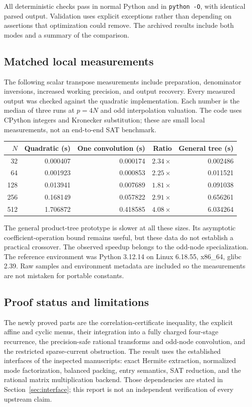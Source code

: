 All deterministic checks pass in normal Python and in \texttt{python -O},
with identical parsed output. Validation uses explicit exceptions rather
than depending on assertions that optimization could remove. The archived
results include both modes and a summary of the comparison.

\subsection{Matched local measurements}
The following scalar transpose measurements include preparation,
denominator inversions, increased working precision, and output recovery.
Every measured output was checked against the quadratic implementation.
Each number is the median of three runs at $p=4N$ and odd interpolation
valuation. The code uses CPython integers and Kronecker substitution;
these are small local measurements, not an end-to-end SAT benchmark.
\begin{center}\small
\begin{tabular}{r r r r r}
\toprule
$N$ & Quadratic (s) & One convolution (s) & Ratio & General tree (s)\\
\midrule
32 & 0.000407 & 0.000174 & $2.34\times$ & 0.002486\\
64 & 0.001923 & 0.000853 & $2.25\times$ & 0.011521\\
128 & 0.013941 & 0.007689 & $1.81\times$ & 0.091038\\
256 & 0.168149 & 0.057822 & $2.91\times$ & 0.656261\\
512 & 1.706872 & 0.418585 & $4.08\times$ & 6.034264\\
\bottomrule
\end{tabular}
\end{center}
The general product-tree prototype is slower at all these sizes. Its
asymptotic coefficient-operation bound remains useful, but these data
do not establish a practical crossover. The observed speedup belongs to
the odd-node specialization. The reference environment was Python 3.12.14
on Linux 6.18.55, x86\_64, glibc 2.39. Raw samples and environment metadata
are included so the measurements are not mistaken for portable constants.

\subsection{Proof status and limitations}
The newly proved parts are the correlation-certificate inequality, the
explicit affine and cyclic menus, their integration into a fully charged
four-stage recurrence, the precision-safe rational transforms and odd-node
convolution, and the restricted sparse-current obstruction. The result
uses the established interfaces of the inspected manuscripts: exact
Hermite extraction, normalized mode factorization, balanced packing,
entry semantics, SAT reduction, and the rational matrix multiplication
backend. Those dependencies are stated in Section~\ref{sec:interface};
this report is not an independent verification of every upstream claim.


